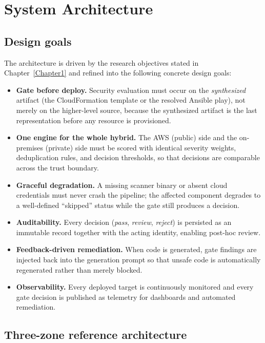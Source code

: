 \section{System Architecture}
\label{sec:architecture}

\subsection{Design goals}
\label{subsec:arch-goals}

The architecture is driven by the research objectives stated in Chapter~\ref{Chapter1}
and refined into the following concrete design goals:

\begin{itemize}
    \item \textbf{Gate before deploy.} Security evaluation must occur on the
    \emph{synthesized} artifact (the CloudFormation template or the resolved Ansible
    play), not merely on the higher-level source, because the synthesized artifact is
    the last representation before any resource is provisioned.
    \item \textbf{One engine for the whole hybrid.} The AWS (public) side and the
    on-premises (private) side must be scored with identical severity weights,
    deduplication rules, and decision thresholds, so that decisions are comparable
    across the trust boundary.
    \item \textbf{Graceful degradation.} A missing scanner binary or absent cloud
    credentials must never crash the pipeline; the affected component degrades to a
    well-defined ``skipped'' status while the gate still produces a decision.
    \item \textbf{Auditability.} Every decision (\emph{pass}, \emph{review},
    \emph{reject}) is persisted as an immutable record together with the acting
    identity, enabling post-hoc review.
    \item \textbf{Feedback-driven remediation.} When code is generated, gate findings
    are injected back into the generation prompt so that unsafe code is automatically
    regenerated rather than merely blocked.
    \item \textbf{Observability.} Every deployed target is continuously monitored and
    every gate decision is published as telemetry for dashboards and automated
    remediation.
\end{itemize}

\subsection{Three-zone reference architecture}
\label{subsec:arch-zones}

